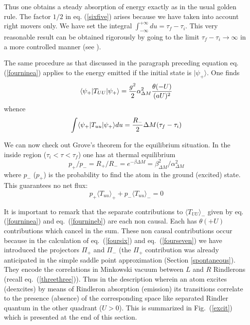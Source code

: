 \documentclass[12pt,oneside]{report}
\def\ket#1{|#1\rangle}
\def\elematrice#1#2#3{\langle #1|#2|#3 \rangle}
\begin{document}
Thus one obtains a steady absorption of energy exactly as in the usual golden rule. The factor
$1/2$ in  eq. (\ref{sixfive}) arises because we have taken into account right
movers only. We have set the integral $\int_{- \infty}^{+\infty} du = \tau_f -
\tau_i$. This very reasonable result can be obtained rigorously by going to the
limit $\tau_f - \tau_i \to \infty$ in a more controlled manner (see 
\cite{MaPa}).

The same procedure as that discussed in the paragraph preceding equation
 eq. (\ref{fourninea}) applies to the energy emitted if the initial state is
$\ket{\psi_+}$. One finds
\begin{equation}   
\elematrice{\psi_+}{T_{UU}}{\psi_+} = {g^2 \over 2
 } \alpha_{\Delta M}^2 {\theta (-U) \over (a U)^2}
\label{sixsix}
\end{equation}
whence
\begin{eqnarray}
 \int \elematrice{\psi_+}{T_{uu}}{\psi_+} du = 
{R_-\over 2} {\Delta M} (\tau_f - \tau_i) \label{sixseven}
\end{eqnarray}

We can now check out Grove's theorem for the equilibrium
situation. In the inside region ($\tau_i < \tau < \tau_f$)
one has at thermal equilibrium
\begin{equation}  
p_+/ p_- =R_+ / R_- = e^{- \beta \Delta M} = \beta_{\Delta M}^2 /
\alpha_{\Delta M}^2
\end{equation}
where $p_-$ ($p_+$) is the probability to find the atom in the
ground (excited) state.
This guarantees no net flux:
\begin{equation}  
p_+ \langle T_{uu} \rangle_+ + 
p_- \langle T_{uu} \rangle_- =0 
\end{equation}

It is important to remark that the separate contributions to 
$\langle T_{UU} \rangle _-$ given by eq. (\ref{fourninea}) and
eq.~(\ref{fournineb}) are each non causal. Each has $\theta(+U)$ contributions
which cancel in the sum. These non causal contributions occur because in
the calculation of eq.~(\ref{foursix}) and
eq.~(\ref{fourseven}) we have introduced the projectors $\Pi_+$ and $\Pi_-$ (the
$\Pi_+$ contribution was already anticipated in the simple saddle point
approximation (Section \ref{spontaneous}).
They encode the correlations in Minkowski vacuum
between $L$ and $R$ Rindlerons (recall eq.~(\ref{threethree})). Thus in the 
description wherein an atom excites (deexcites) by means of Rindleron
absorption (emission) its transitions correlate to the presence (absence) of
the corresponding space like separated Rindler quantum in the other quadrant
($U>0$). This is summarized in Fig.~(\ref{excit}) which is presented at the end of
this section.
\end{document}
